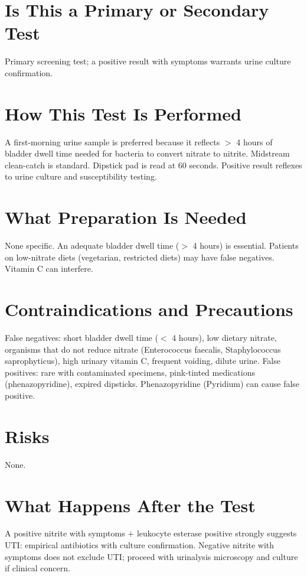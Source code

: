 \section*{Is This a Primary or Secondary Test}
Primary screening test; a positive result with symptoms warrants urine culture confirmation.

\section*{How This Test Is Performed}
A first-morning urine sample is preferred because it reflects $>$ 4 hours of bladder dwell time needed for bacteria to convert nitrate to nitrite. Midstream clean-catch is standard. Dipstick pad is read at 60 seconds. Positive result reflexes to urine culture and susceptibility testing.

\section*{What Preparation Is Needed}
None specific. An adequate bladder dwell time ($>$ 4 hours) is essential. Patients on low-nitrate diets (vegetarian, restricted diets) may have false negatives. Vitamin C can interfere.

\section*{Contraindications and Precautions}
False negatives: short bladder dwell time ($<$ 4 hours), low dietary nitrate, organisms that do not reduce nitrate (Enterococcus faecalis, Staphylococcus saprophyticus), high urinary vitamin C, frequent voiding, dilute urine. False positives: rare with contaminated specimens, pink-tinted medications (phenazopyridine), expired dipsticks. Phenazopyridine (Pyridium) can cause false positive.

\section*{Risks}
None.

\section*{What Happens After the Test}
A positive nitrite with symptoms $+$ leukocyte esterase positive strongly suggests UTI: empirical antibiotics with culture confirmation. Negative nitrite with symptoms does not exclude UTI; proceed with urinalysis microscopy and culture if clinical concern.

